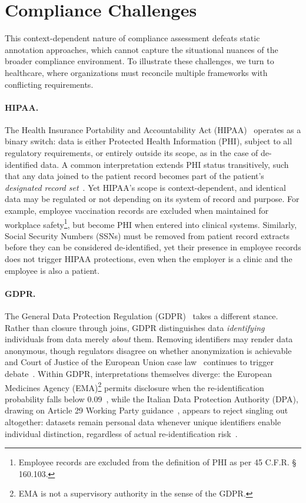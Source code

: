 \documentclass[runningheads,oneside]{llncs}
\begin{document}
\section{Compliance Challenges}\label{sec:legal}

This context-dependent nature of compliance assessment defeats static annotation approaches, which cannot capture the situational nuances of the broader compliance environment. To illustrate these challenges, we turn to healthcare, where organizations must reconcile multiple frameworks with conflicting requirements.

\paragraph{HIPAA.}
The Health Insurance Portability and Accountability Act (HIPAA)~\cite{hipaa-privacy} operates as a binary switch: data is either Protected Health Information (PHI), subject to all regulatory requirements, or entirely outside its scope, as in the case of de-identified data. A common interpretation extends PHI status transitively, such that any data joined to the patient record becomes part of the patient’s \emph{designated record set}~\cite{hipaa-privacy}. Yet HIPAA’s scope is context-dependent, and identical data may be regulated or not depending on its system of record and purpose. For example, employee vaccination records are excluded when maintained for workplace safety\footnote{Employee records are excluded from the definition of PHI as per 45 C.F.R. § 160.103.}, but become PHI when entered into clinical systems. Similarly, Social Security Numbers (SSNs) must be removed from patient record extracts before they can be considered de-identified, yet their presence in employee records does not trigger HIPAA protections, even when the employer is a clinic and the employee is also a patient.


\paragraph{GDPR.}
The General Data Protection Regulation (GDPR)~\cite{gdpr} takes a different stance. Rather than closure through joins, GDPR distinguishes data \emph{identifying} individuals from data merely \emph{about} them. Removing identifiers may render data anonymous, though regulators disagree on whether anonymization is achievable~\cite{stalla_rossi_2021,stalla_2025} and Court of Justice of the European Union case law~\cite{srb} continues to trigger debate~\cite{stalla_2025b}. Within GDPR, interpretations themselves diverge: the European Medicines Agency (EMA)\footnote{EMA is not a supervisory authority in the sense of the GDPR.} permits disclosure when the re-identification probability falls below 0.09~\cite{ema_external_guidance_2016,ema_external_guidance_2025}, while the Italian Data Protection Authority (DPA), drawing on Article 29 Working Party guidance~\cite{wp29-anonymization}, appears to reject singling out altogether: datasets remain personal data whenever unique identifiers enable individual distinction, regardless of actual re-identification risk~\cite{italian-thin-2023}.
\end{document}
